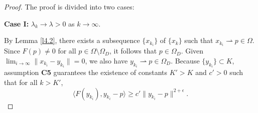 \documentclass[hidelinks,11 pt]{article}
\numberwithin{equation}{section}
\theoremstyle{definition}  %
\numberwithin{equation}{section}
\numberwithin{theorem}{section}
\begin{document}
\begin{proof}
The proof is divided into two cases:

\vskip 2mm
\textbf{Case I:} \(\lambda_k \to \lambda > 0\) as \(k \to \infty\).

By Lemma \ref{l4.2}, there exists a subsequence \(\{x_{k_i}\}\) of \(\{x_k\}\) such that
$x_{k_i} \rightharpoonup p \in \Omega$.
Since \(F(p) \neq 0\) for all \(p \in \Omega \setminus \Omega_D\), it follows that \(p \in \Omega_D\). Given \(\lim_{i \to \infty} \|x_{k_i} - y_{k_i}\| = 0\), we also have
$y_{k_i} \rightharpoonup p \in \Omega_D$.
Because \(\{y_{k_i}\} \subset K\), assumption \textbf{C5} guarantees the existence of constants \(K' > K\) and \(c' > 0\) such that for all \(k > K'\),
\begin{equation*}
\langle F(y_{k_i}), y_{k_i} - p \rangle \geq c' \|y_{k_i} - p\|^{2 + \epsilon}\tag{4.17}\label{eq:4.17}.
\end{equation*}


\end{proof}
\end{document}
